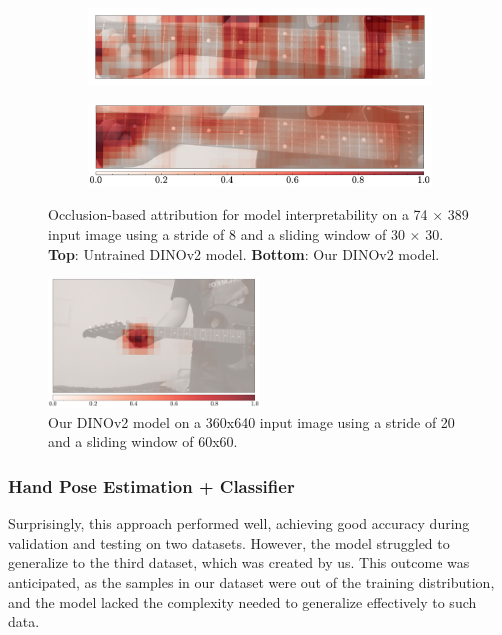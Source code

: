 \documentclass[10pt,twocolumn,letterpaper]{article}
\begin{document}
\begin{figure}[h]
    \centering
    \begin{subfigure}[t]{0.5\textwidth}
        \centering
        \includegraphics[width=\textwidth]{images/final/occlusion_untrained.pdf}
    \end{subfigure}
    \begin{subfigure}[t]{0.5\textwidth}
        \centering
        \includegraphics[width=\textwidth]{images/final/occlusion_trained.pdf}
    \end{subfigure}
    \caption{Occlusion-based attribution \cite{kokhlikyan2020captum} for model interpretability on a 74 $\times$ 389 input image using a stride of 8 and a sliding window of 30 $\times$ 30. \textbf{Top}: Untrained DINOv2 model. \textbf{Bottom}: Our DINOv2 model.}
    \label{fig:chord-classifier-visualization-fretboard}
\end{figure}

\begin{figure}[h]
    \centering
    \includegraphics[width=0.5\textwidth]{images/final/occlusion_trained_full.pdf}
    \caption{Our DINOv2 model on a 360x640 input image using a stride of 20 and a sliding window of 60x60.}
    \label{fig:chord-classifier-visualization-fretboard-2}
\end{figure}

\subsubsection{Hand Pose Estimation + Classifier}
Surprisingly, this approach performed well, achieving good accuracy during validation and testing on two datasets. However, the model struggled to generalize to the third dataset, which was created by us. This outcome was anticipated, as the samples in our dataset were out of the training distribution, and the model lacked the complexity needed to generalize effectively to such data.
\end{document}
